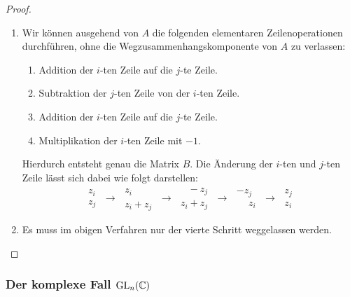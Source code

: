 \begin{proof}
\begin{enumerate}[label = \alph*)]
    \item
      Wir können ausgehend von $A$ die folgenden elementaren Zeilenoperationen durchführen, ohne die Wegzusammenhangskomponente von $A$ zu verlassen:
      \begin{enumerate}[label = \arabic*.]
        \item
          Addition der $i$-ten Zeile auf die $j$-te Zeile.
        \item
          Subtraktion der $j$-ten Zeile von der $i$-ten Zeile.
        \item
          Addition der $i$-ten Zeile auf die $j$-te Zeile.
        \item
          Multiplikation der $i$-ten Zeile mit $-1$.
      \end{enumerate}
      Hierdurch entsteht genau die Matrix $B$.
      Die Änderung der $i$-ten und $j$-ten Zeile lässt sich dabei wie folgt darstellen:
      \[
        \begin{matrix}
          z_i \\ z_j
        \end{matrix}
        \;\to\;
        \begin{matrix}
          z_i \phantom{+ z_j} \\ z_i + z_j
        \end{matrix}
        \;\to\;
        \begin{matrix}
          \phantom{z_i} - z_j \\ z_i + z_j
        \end{matrix}
        \;\to\;
        \begin{matrix}
          -z_j \\ \phantom{-}z_i
        \end{matrix}
        \;\to\;
        \begin{matrix}
          z_j \\ z_i
        \end{matrix}
      \]
      
    \item
      Es muss im obigen Verfahren nur der vierte Schritt weggelassen werden.
    \qedhere
  \end{enumerate}
\end{proof}





\subsubsection{Der komplexe Fall \texorpdfstring{$\operatorname{GL}_{n}(\mathbb{C})$}{GLn(C)}}

